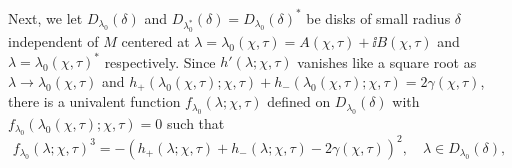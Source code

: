 Next, we let $D_{\lambda_0}(\delta)$ and $D_{\lambda_0^*}(\delta)=D_{\lambda_0}(\delta)^*$ be disks of small radius $\delta$ independent of 
$M$
centered at $\lambda=\lambda_0(\chi,\tau)=A(\chi,\tau)+\ii B(\chi,\tau)$ and $\lambda=\lambda_0(\chi,\tau)^*$ respectively.  
Since $h'(\lambda;\chi,\tau)$ vanishes like a square root as $\lambda\to \lambda_0(\chi,\tau)$ and $h_+(\lambda_0(\chi,\tau);\chi,\tau)+h_-(\lambda_0(\chi,\tau);\chi,\tau)=2\gamma(\chi,\tau)$, there is a univalent function $f_{\lambda_0}(\lambda;\chi,\tau)$ defined on $D_{\lambda_0}(\delta)$ with $f_{\lambda_0}(\lambda_0(\chi,\tau);\chi,\tau)=0$ such that 
\begin{equation}
f_{\lambda_0}(\lambda;\chi,\tau)^3=-(h_+(\lambda;\chi,\tau)+h_-(\lambda;\chi,\tau)-2\gamma(\chi,\tau))^2,\quad \lambda\in D_{\lambda_0}(\delta),
\label{eq:Airy-map-Schi-Stau-ALT}
\end{equation}
